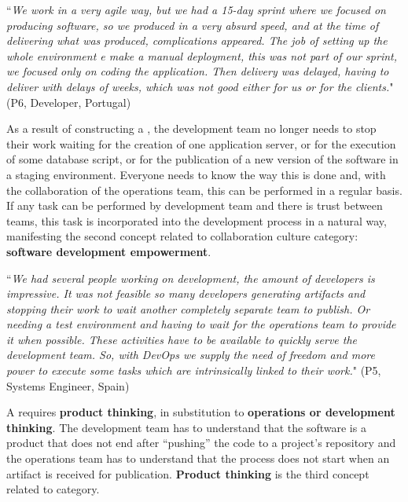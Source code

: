 \begin{mq}
  ``\emph{We work in a very agile way, but we had a 15-day sprint where we focused on
producing software, so we produced in a very absurd speed, and at the time of
delivering what was produced, complications appeared. The job of setting up
the whole environment e make a manual deployment, this was not part of our
sprint, we focused only on coding the application. Then delivery was delayed,
having to deliver with delays of weeks, which was not good either for us or for
the clients.}" (P6, Developer, Portugal)
\end{mq}

As a result of constructing a , the development
team no longer needs to stop their work waiting for the creation
of one application server, or for the execution of some database script, or for
the publication of a new version of the software in a staging environment.
Everyone needs to know the way this is done and, with the collaboration of the
operations team, this can be performed in a regular basis. If any task can be
performed by development team and there is trust between teams, this task is
incorporated into the development process in a natural way, manifesting the
second concept related to collaboration culture category: \textbf{software
development empowerment}.

\begin{mq}
``\emph{We had several people working on development, the amount of developers is
impressive. It was not feasible so many developers generating artifacts and
stopping their work to wait another completely separate team to publish. Or
needing a test environment and having to wait for the operations team to
provide it when possible. These activities have to be available to quickly
serve the development team. So, with DevOps we supply the need of freedom and
more power to execute some tasks which are intrinsically linked to their work.}"
(P5, Systems Engineer, Spain)
\end{mq}

A  requires  \textbf{product thinking}, in substitution to
\textbf{operations or development thinking}. The development team has to understand that
the software is a product that does not end after ``pushing'' the code to a 
project's repository and the operations team has to understand that the process does not
start when an artifact is received for publication. \textbf{Product thinking}
is the third concept related to  category.

